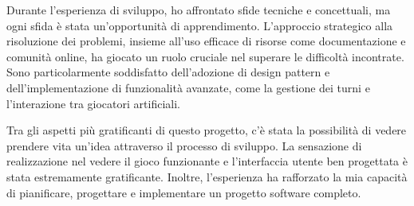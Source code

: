 Durante l'esperienza di sviluppo, ho affrontato sfide tecniche e concettuali, ma ogni sfida è stata un'opportunità di apprendimento. L'approccio strategico alla risoluzione dei problemi, insieme all'uso efficace di risorse come documentazione e comunità online, ha giocato un ruolo cruciale nel superare le difficoltà incontrate. Sono particolarmente soddisfatto dell'adozione di design pattern e dell'implementazione di funzionalità avanzate, come la gestione dei turni e l'interazione tra giocatori artificiali.

Tra gli aspetti più gratificanti di questo progetto, c'è stata la possibilità di vedere prendere vita un'idea attraverso il processo di sviluppo. La sensazione di realizzazione nel vedere il gioco funzionante e l'interfaccia utente ben progettata è stata estremamente gratificante. Inoltre, l'esperienza ha rafforzato la mia capacità di pianificare, progettare e implementare un progetto software completo.
